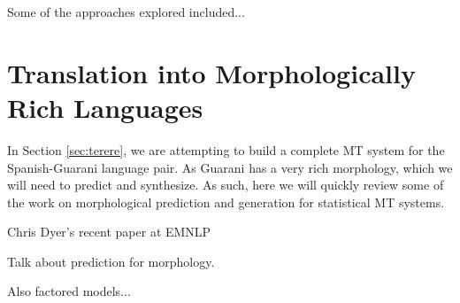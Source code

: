 Some of the approaches explored included...



\section{Translation into Morphologically Rich Languages}
In Section \ref{sec:terere}, we are attempting to build a complete MT system
for the Spanish-Guarani language pair. As Guarani has a very rich morphology,
which we will need to predict and synthesize. As such, here we will quickly
review some of the work on morphological prediction and generation for
statistical MT systems.

Chris Dyer's recent paper at EMNLP
\cite{chahuneau:2013:emnlp}

Talk about prediction for morphology.
\cite{toutanova-suzuki-ruopp:2008:ACLMain}

Also factored models...
\cite{yeniterzi-oflazer:2010:ACL}
